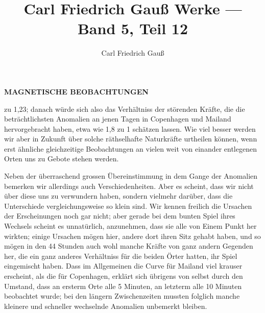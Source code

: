 \documentclass[12pt,a4paper]{article}
\title{Carl Friedrich Gau\ss{} Werke --- Band 5, Teil 12}
\author{Carl Friedrich Gau\ss}
\date{}
\begin{document}
\maketitle

\thispagestyle{empty}
\begin{center}
\Large\textbf{MAGNETISCHE BEOBACHTUNGEN}
\end{center}
\vspace{2em}


 zu 1,23; danach w\"urde sich also das Verh\"altniss der st\"orenden Kr\"afte, die die betr\"achtlichsten Anomalien an jenen Tagen in Copenhagen und Mailand hervorgebracht haben, etwa wie 1,8 zu 1 sch\"atzen lassen. Wie viel besser werden wir aber in Zukunft \"uber solche r\"athselhafte Naturkr\"afte urtheilen k\"onnen, wenn erst \"ahnliche gleichzeitige Beobachtungen an vielen weit von einander entlegenen Orten uns zu Gebote stehen werden.

Neben der \"uberraschend grossen \"Ubereinstimmung in dem Gange der Anomalien bemerken wir allerdings auch Verschiedenheiten. Aber es scheint, dass wir nicht \"uber diese uns zu verwundern haben, sondern vielmehr dar\"uber, dass die Unterschiede vergleichungsweise so klein sind. Wir kennen freilich die Ursachen der Erscheinungen noch gar nicht; aber gerade bei dem bunten Spiel ihres Wechsels scheint es unnat\"urlich, anzunehmen, dass sie alle von Einem Punkt her wirkten; einige Ursachen m\"ogen hier, andere dort ihren Sitz gehabt haben, und so m\"ogen in den 44 Stunden auch wohl manche Kr\"afte von ganz andern Gegenden her, die ein ganz anderes Verh\"altniss f\"ur die beiden \"Orter hatten, ihr Spiel eingemischt haben. Dass im Allgemeinen die Curve f\"ur Mailand viel krauser erscheint, als die f\"ur Copenhagen, erkl\"art sich \"ubrigens von selbst durch den Umstand, dass an ersterm Orte alle 5 Minuten, an letzterm alle 10 Minuten beobachtet wurde; bei den l\"angern Zwischenzeiten mussten folglich manche kleinere und schneller wechselnde Anomalien unbemerkt bleiben.
\end{document}
